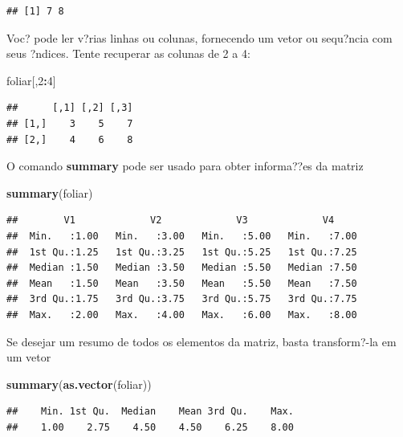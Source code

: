 \documentclass[]{book}
\newenvironment{Shaded}{\begin{snugshade}}{\end{snugshade}}
\newcommand{\DecValTok}[1]{\textcolor[rgb]{0.00,0.00,0.81}{#1}}
\newcommand{\KeywordTok}[1]{\textcolor[rgb]{0.13,0.29,0.53}{\textbf{#1}}}
\newcommand{\NormalTok}[1]{#1}
\newcommand{\OperatorTok}[1]{\textcolor[rgb]{0.81,0.36,0.00}{\textbf{#1}}}
\begin{document}
\begin{verbatim}
## [1] 7 8
\end{verbatim}

Voc? pode ler v?rias linhas ou colunas, fornecendo um vetor ou sequ?ncia com seus ?ndices. Tente recuperar as colunas de 2 a 4:

\begin{Shaded}
\begin{Highlighting}[]
\NormalTok{foliar[,}\DecValTok{2}\OperatorTok{:}\DecValTok{4}\NormalTok{]}
\end{Highlighting}
\end{Shaded}

\begin{verbatim}
##      [,1] [,2] [,3]
## [1,]    3    5    7
## [2,]    4    6    8
\end{verbatim}

O comando \textbf{summary} pode ser usado para obter informa??es da matriz

\begin{Shaded}
\begin{Highlighting}[]
\KeywordTok{summary}\NormalTok{(foliar)}
\end{Highlighting}
\end{Shaded}

\begin{verbatim}
##        V1             V2             V3             V4      
##  Min.   :1.00   Min.   :3.00   Min.   :5.00   Min.   :7.00  
##  1st Qu.:1.25   1st Qu.:3.25   1st Qu.:5.25   1st Qu.:7.25  
##  Median :1.50   Median :3.50   Median :5.50   Median :7.50  
##  Mean   :1.50   Mean   :3.50   Mean   :5.50   Mean   :7.50  
##  3rd Qu.:1.75   3rd Qu.:3.75   3rd Qu.:5.75   3rd Qu.:7.75  
##  Max.   :2.00   Max.   :4.00   Max.   :6.00   Max.   :8.00
\end{verbatim}

Se desejar um resumo de todos os elementos da matriz, basta transform?-la em um vetor

\begin{Shaded}
\begin{Highlighting}[]
\KeywordTok{summary}\NormalTok{(}\KeywordTok{as.vector}\NormalTok{(foliar))}
\end{Highlighting}
\end{Shaded}

\begin{verbatim}
##    Min. 1st Qu.  Median    Mean 3rd Qu.    Max. 
##    1.00    2.75    4.50    4.50    6.25    8.00
\end{verbatim}
\end{document}
